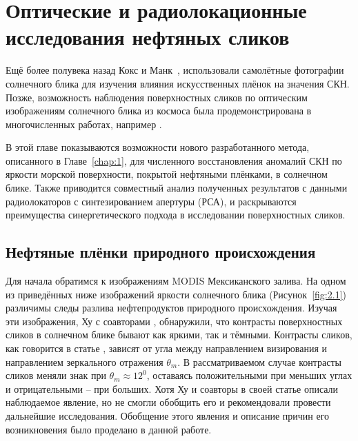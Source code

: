 \chapter{Оптические и радиолокационные исследования нефтяных сликов} \label{chap:2}




Ещё более полувека назад Кокс и Манк~\citep{Cox1954, Cox1954a}, использовали самолётные фотографии солнечного блика для изучения влияния искусственных плёнок на значения СКН. Позже, возможность наблюдения поверхностных сликов по оптическим изображениям солнечного блика из космоса была продемонстрирована в многочисленных работах, например \citep{Brekke2005, Chust2007, Hu2009}.

В этой главе показываются возможности нового разработанного метода, описанного в Главе~\ref{chap:1}, для численного восстановления аномалий СКН по яркости морской поверхности, покрытой нефтяными плёнками, в солнечном блике. Также приводится совместный анализ полученных результатов с данными радиолокаторов с синтезированием апертуры (РСА), и раскрываются преимущества синергетического подхода в исследовании поверхностных сликов.



\section{Нефтяные плёнки природного происхождения} \label{sec:2.1}

Для начала обратимся к изображениям MODIS Мексиканского залива. На одном из приведённых ниже изображений яркости солнечного блика (Рисунок~\ref{fig:2.1}) различимы следы разлива нефтепродуктов природного происхождения. Изучая эти изображения, Ху с соавторами \citep{Hu2009}, обнаружили, что контрасты поверхностных сликов в солнечном блике бывают как яркими, так и тёмными. Контрасты сликов, как говорится в статье \citep{Hu2009}, зависят от угла между направлением визирования и направлением зеркального отражения $\theta _{m} $. В рассматриваемом случае контрасты сликов меняли знак при $\theta _{m} \approx 12^{0} $, оставаясь положительными при меньших углах и отрицательными -- при больших. Хотя Ху и соавторы в своей статье \citep{Hu2009} описали наблюдаемое явление, но не смогли обобщить его и рекомендовали провести дальнейшие исследования. Обобщение этого явления и описание причин его возникновения было проделано в данной работе.

